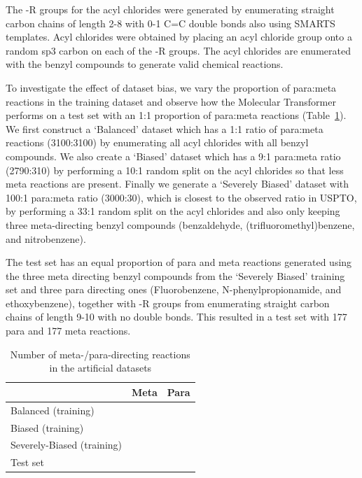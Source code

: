 The -R groups for the acyl chlorides were generated by enumerating straight carbon chains of length 2-8 with 0-1 C=C double bonds also using SMARTS templates. Acyl chlorides were obtained by placing an acyl chloride group onto a random sp3 carbon on each of the -R groups. The acyl chlorides are enumerated with the benzyl compounds to generate valid chemical reactions. 

To investigate the effect of dataset bias, we vary the proportion of para:meta reactions in the training dataset and observe how the Molecular Transformer performs on a test set with an 1:1 proportion of para:meta reactions (Table~\ref{table:synth_datasets}). We first construct a `Balanced' dataset which has a 1:1 ratio of para:meta reactions (3100:3100) by enumerating all acyl chlorides with all benzyl compounds.  We also create a `Biased' dataset which has a 9:1 para:meta ratio (2790:310) by performing a 10:1 random split on the acyl chlorides so that less meta reactions are present. Finally we generate a `Severely Biased' dataset with 100:1 para:meta ratio (3000:30), which is closest to the observed ratio in USPTO, by performing a 33:1 random split on the acyl chlorides and also only keeping three meta-directing benzyl compounds (benzaldehyde, (trifluoromethyl)benzene, and nitrobenzene).

The test set has an equal proportion of para and meta reactions generated using the three meta directing benzyl compounds from the `Severely Biased' training set and three para directing ones (Fluorobenzene, N-phenylpropionamide, and ethoxybenzene), together with -R groups from enumerating straight carbon chains of length 9-10 with no double bonds. This resulted in a test set with 177 para and 177 meta reactions.

\begin{table}[!h]
    \caption{Number of meta-/para-directing reactions in the artificial datasets}
    \centering
    \label{table:synth_datasets}
    \begin{tabular}{m{}>{\centering}m{}>{\centering \arraybackslash}m{}}
    \toprule
      & \textbf{Meta} & \textbf{Para} \\ 
    \midrule
    Balanced (training) & 3100 & 3100  \\
    Biased (training) & 310 & 2790  \\
    Severely-Biased (training) & 30 & 3000  \\
    \midrule
    Test set & 177 & 177  \\
    \bottomrule
    \end{tabular}
    \end{table}

